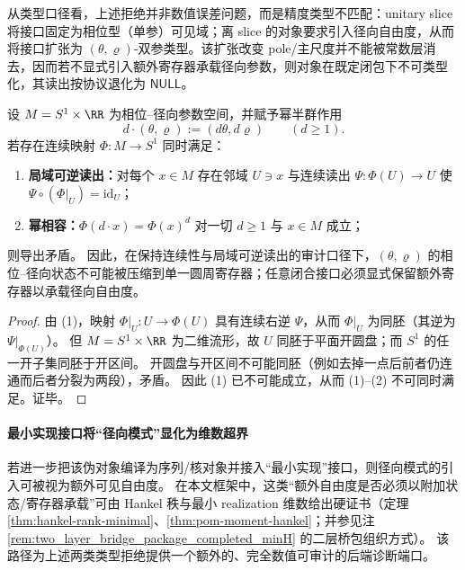 从类型口径看，上述拒绝并非数值误差问题，而是精度类型不匹配：unitary slice 将接口固定为相位型（单参）可见域；离 slice 的对象要求引入径向自由度，从而将接口扩张为 \((\theta,\varrho)\)-双参类型。该扩张改变 pole/主尺度并不能被常数层消去，因而若不显式引入额外寄存器承载径向参数，则对象在既定闭包下不可类型化，其读出按协议退化为 \(\mathsf{NULL}\)。

\begin{theorem}\label{thm:radial-dimension-obstruction}
设 \(M=S^{1}\times\RR\) 为相位--径向参数空间，并赋予幂半群作用
\[
d\cdot(\theta,\varrho):=(d\theta,d\varrho)\qquad(d\ge 1).
\]
若存在连续映射 \(\Phi:M\to S^{1}\) 同时满足：
\begin{enumerate}
  \item \textbf{局域可逆读出：}对每个 \(x\in M\) 存在邻域 \(U\ni x\) 与连续读出 \(\Psi:\Phi(U)\to U\) 使 \(\Psi\circ(\Phi|_{U})=\mathrm{id}_{U}\)；
  \item \textbf{幂相容：}\(\Phi(d\cdot x)=\Phi(x)^{d}\) 对一切 \(d\ge 1\) 与 \(x\in M\) 成立；
\end{enumerate}
则导出矛盾。
因此，在保持连续性与局域可逆读出的审计口径下，\((\theta,\varrho)\) 的相位--径向状态不可能被压缩到单一圆周寄存器；任意闭合接口必须显式保留额外寄存器以承载径向自由度。
\end{theorem}
\begin{proof}
由 (1)，映射 \(\Phi|_{U}:U\to \Phi(U)\) 具有连续右逆 \(\Psi\)，从而 \(\Phi|_{U}\) 为同胚（其逆为 \(\Psi|_{\Phi(U)}\)）。
但 \(M=S^{1}\times\RR\) 为二维流形，故 \(U\) 同胚于平面开圆盘；而 \(S^{1}\) 的任一开子集同胚于开区间。
开圆盘与开区间不可能同胚（例如去掉一点后前者仍连通而后者分裂为两段），矛盾。
因此 (1) 已不可能成立，从而 (1)--(2) 不可同时满足。证毕。
\end{proof}

\paragraph{最小实现接口将“径向模式”显化为维数超界}
若进一步把该伪对象编译为序列/核对象并接入“最小实现”接口，则径向模式的引入可被视为额外可见自由度。
在本文框架中，这类“额外自由度是否必须以附加状态/寄存器承载”可由 Hankel 秩与最小 realization 维数给出硬证书（定理 \ref{thm:hankel-rank-minimal}、\ref{thm:pom-moment-hankel}；并参见注 \ref{rem:two_layer_bridge_package_completed_minH} 的二层桥包组织方式）。
该路径为上述两类类型拒绝提供一个额外的、完全数值可审计的后端诊断端口。

